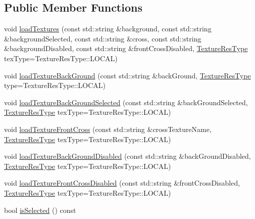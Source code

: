\subsection*{Public Member Functions}
\begin{DoxyCompactItemize}
\item 
void \hyperlink{classui_1_1AbstractCheckButton_a4d375837cd83ff2008fffecf3a5ed1ac}{load\+Textures} (const std\+::string \&background, const std\+::string \&background\+Selected, const std\+::string \&cross, const std\+::string \&background\+Disabled, const std\+::string \&front\+Cross\+Disabled, \hyperlink{classui_1_1Widget_a040a65ec5ad3b11119b7e16b98bd9af0}{Texture\+Res\+Type} tex\+Type=Texture\+Res\+Type\+::\+L\+O\+C\+AL)
\item 
void \hyperlink{classui_1_1AbstractCheckButton_a881269a03ef3da6feeb95a97369c1e37}{load\+Texture\+Back\+Ground} (const std\+::string \&back\+Ground, \hyperlink{classui_1_1Widget_a040a65ec5ad3b11119b7e16b98bd9af0}{Texture\+Res\+Type} type=Texture\+Res\+Type\+::\+L\+O\+C\+AL)
\item 
void \hyperlink{classui_1_1AbstractCheckButton_a060437afe2b6064928901d4839b2c5dc}{load\+Texture\+Back\+Ground\+Selected} (const std\+::string \&back\+Ground\+Selected, \hyperlink{classui_1_1Widget_a040a65ec5ad3b11119b7e16b98bd9af0}{Texture\+Res\+Type} tex\+Type=Texture\+Res\+Type\+::\+L\+O\+C\+AL)
\item 
void \hyperlink{classui_1_1AbstractCheckButton_a8a94e8e135a5e8d1d0be187d77970323}{load\+Texture\+Front\+Cross} (const std\+::string \&cross\+Texture\+Name, \hyperlink{classui_1_1Widget_a040a65ec5ad3b11119b7e16b98bd9af0}{Texture\+Res\+Type} tex\+Type=Texture\+Res\+Type\+::\+L\+O\+C\+AL)
\item 
void \hyperlink{classui_1_1AbstractCheckButton_a6571d84aee7a30b97be6488dd08b6690}{load\+Texture\+Back\+Ground\+Disabled} (const std\+::string \&back\+Ground\+Disabled, \hyperlink{classui_1_1Widget_a040a65ec5ad3b11119b7e16b98bd9af0}{Texture\+Res\+Type} tex\+Type=Texture\+Res\+Type\+::\+L\+O\+C\+AL)
\item 
void \hyperlink{classui_1_1AbstractCheckButton_a6434adf3966aa318552301fbdd32e6b2}{load\+Texture\+Front\+Cross\+Disabled} (const std\+::string \&front\+Cross\+Disabled, \hyperlink{classui_1_1Widget_a040a65ec5ad3b11119b7e16b98bd9af0}{Texture\+Res\+Type} tex\+Type=Texture\+Res\+Type\+::\+L\+O\+C\+AL)
\item 
bool \hyperlink{classui_1_1AbstractCheckButton_ade8bb264515600c46a81947344f4a53b}{is\+Selected} () const
\item 

\end{DoxyCompactItemize}
